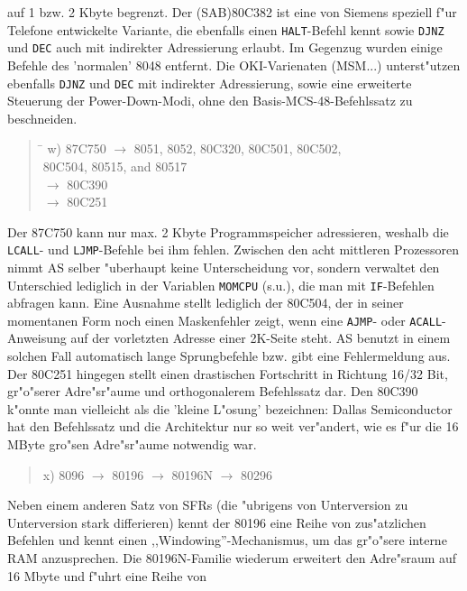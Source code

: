 \documentclass[12pt,a4paper,twoside]{report}
\newcommand{\tty}[1]{{\tt #1}}
\begin{document}
auf 1 bzw. 2 Kbyte begrenzt.  Der (SAB)80C382 ist eine von
Siemens speziell f"ur Telefone entwickelte Variante, die ebenfalls
einen \tty{HALT}-Befehl kennt sowie \tty{DJNZ} und \tty{DEC} auch
mit indirekter Adressierung erlaubt.  Im Gegenzug wurden einige
Befehle des 'normalen' 8048 entfernt. Die OKI-Varienaten (MSM...)
unterst"utzen ebenfalls \tty{DJNZ} und \tty{DEC} mit indirekter
Adressierung, sowie eine erweiterte Steuerung der
Power-Down-Modi, ohne den Basis-MCS-48-Befehlssatz zu
beschneiden.
\begin{quote}
\begin{tabbing}
\hspace{0.7cm} \= \kill
w) \> 87C750 $\rightarrow$ 8051, 8052, 80C320, 80C501, 80C502, \\
   \> 80C504, 80515, and 80517 \\
   \> $\rightarrow$ 80C390 \\
   \> $\rightarrow$ 80C251
\end{tabbing}
\end{quote}
Der 87C750 kann nur max. 2 Kbyte Programmspeicher adressieren, weshalb
die \tty{LCALL}- und \tty{LJMP}-Befehle bei ihm fehlen.  Zwischen den
acht mittleren Prozessoren nimmt AS selber "uberhaupt keine Unterscheidung
vor, sondern verwaltet den Unterschied lediglich in der Variablen
\tty{MOMCPU} (s.u.), die man mit \tty{IF}-Befehlen abfragen kann.  Eine
Ausnahme stellt lediglich der 80C504, der in seiner momentanen Form noch einen
Maskenfehler zeigt, wenn eine \tty{AJMP}- oder \tty{ACALL}-Anweisung auf der
vorletzten Adresse einer 2K-Seite steht.  AS benutzt in einem solchen
Fall automatisch lange Sprungbefehle bzw. gibt eine Fehlermeldung aus.  Der
80C251 hingegen stellt einen drastischen Fortschritt in Richtung 16/32 Bit,
gr"o"serer Adre"sr"aume und orthogonalerem Befehlssatz dar.  Den 80C390
k"onnte man vielleicht als die 'kleine L"osung' bezeichnen:  Dallas
Semiconductor hat den Befehlssatz und die Architektur nur so weit
ver"andert, wie es f"ur die 16 MByte gro"sen Adre"sr"aume notwendig war.
\begin{quote}
x) 8096 $\rightarrow$ 80196 $\rightarrow$ 80196N $\rightarrow$ 80296
\end{quote}
Neben einem anderen Satz von SFRs (die "ubrigens von Unterversion zu
Unterversion stark differieren) kennt der 80196 eine Reihe von
zus"atzlichen Befehlen und kennt einen ,,Windowing''-Mechanismus, um
das gr"o"sere interne RAM anzusprechen.  Die 80196N-Familie wiederum
erweitert den Adre"sraum auf 16 Mbyte und f"uhrt eine Reihe von
\end{document}
